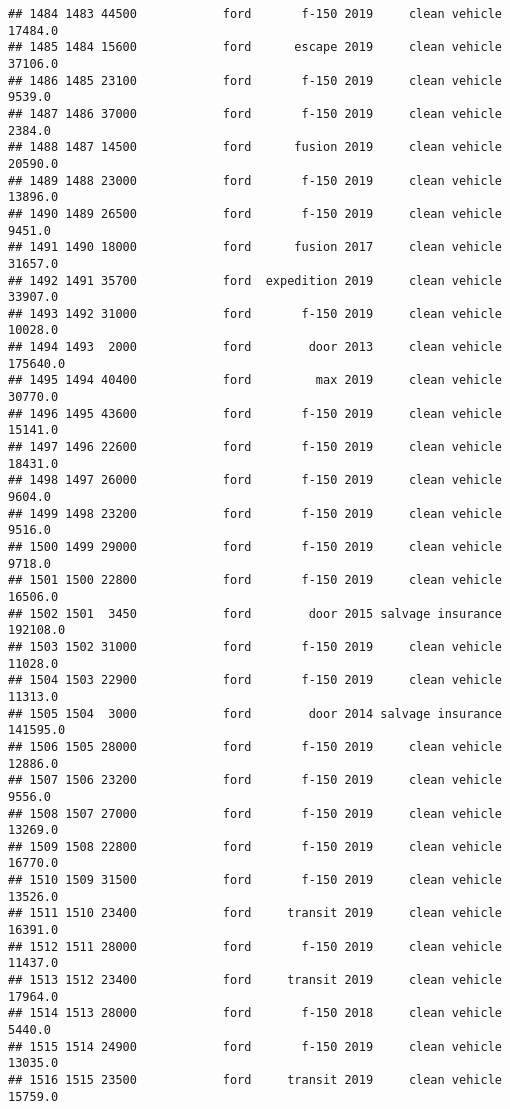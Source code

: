 \documentclass[
]{article}
\begin{document}
\begin{verbatim}
## 1484 1483 44500            ford       f-150 2019     clean vehicle   17484.0
## 1485 1484 15600            ford      escape 2019     clean vehicle   37106.0
## 1486 1485 23100            ford       f-150 2019     clean vehicle    9539.0
## 1487 1486 37000            ford       f-150 2019     clean vehicle    2384.0
## 1488 1487 14500            ford      fusion 2019     clean vehicle   20590.0
## 1489 1488 23000            ford       f-150 2019     clean vehicle   13896.0
## 1490 1489 26500            ford       f-150 2019     clean vehicle    9451.0
## 1491 1490 18000            ford      fusion 2017     clean vehicle   31657.0
## 1492 1491 35700            ford  expedition 2019     clean vehicle   33907.0
## 1493 1492 31000            ford       f-150 2019     clean vehicle   10028.0
## 1494 1493  2000            ford        door 2013     clean vehicle  175640.0
## 1495 1494 40400            ford         max 2019     clean vehicle   30770.0
## 1496 1495 43600            ford       f-150 2019     clean vehicle   15141.0
## 1497 1496 22600            ford       f-150 2019     clean vehicle   18431.0
## 1498 1497 26000            ford       f-150 2019     clean vehicle    9604.0
## 1499 1498 23200            ford       f-150 2019     clean vehicle    9516.0
## 1500 1499 29000            ford       f-150 2019     clean vehicle    9718.0
## 1501 1500 22800            ford       f-150 2019     clean vehicle   16506.0
## 1502 1501  3450            ford        door 2015 salvage insurance  192108.0
## 1503 1502 31000            ford       f-150 2019     clean vehicle   11028.0
## 1504 1503 22900            ford       f-150 2019     clean vehicle   11313.0
## 1505 1504  3000            ford        door 2014 salvage insurance  141595.0
## 1506 1505 28000            ford       f-150 2019     clean vehicle   12886.0
## 1507 1506 23200            ford       f-150 2019     clean vehicle    9556.0
## 1508 1507 27000            ford       f-150 2019     clean vehicle   13269.0
## 1509 1508 22800            ford       f-150 2019     clean vehicle   16770.0
## 1510 1509 31500            ford       f-150 2019     clean vehicle   13526.0
## 1511 1510 23400            ford     transit 2019     clean vehicle   16391.0
## 1512 1511 28000            ford       f-150 2019     clean vehicle   11437.0
## 1513 1512 23400            ford     transit 2019     clean vehicle   17964.0
## 1514 1513 28000            ford       f-150 2018     clean vehicle    5440.0
## 1515 1514 24900            ford       f-150 2019     clean vehicle   13035.0
## 1516 1515 23500            ford     transit 2019     clean vehicle   15759.0

\end{verbatim}
\end{document}
